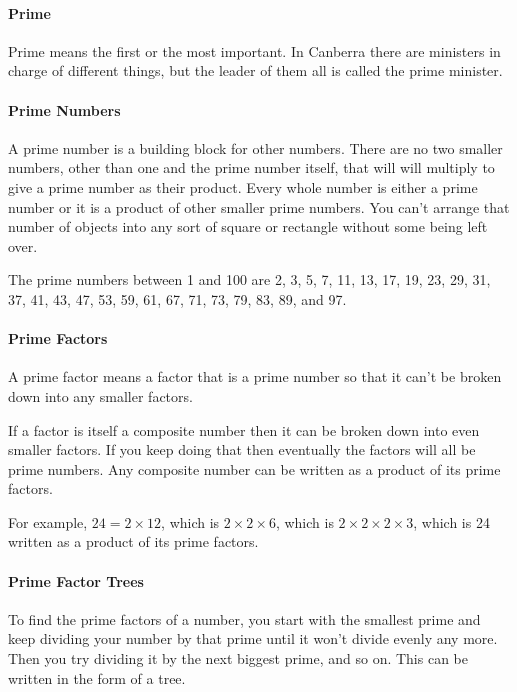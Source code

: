 \documentclass[12pt]{article}
\begin{document}
{\paragraph{Prime}
Prime means the first or the most important. In Canberra there are ministers in charge of different things, but the leader of them all is called the prime minister.

\paragraph{Prime Numbers}
A prime number is a building block for other numbers. There are no two smaller numbers, other than one and the prime number itself, that will will multiply to give a prime number as their product. Every whole number is either a prime number or it is a product of other smaller prime numbers. You can't arrange that number of objects into any sort of square or rectangle without some being left over.

The prime numbers between 1 and 100 are 2, 3, 5, 7, 11, 13, 17, 19, 23, 29, 31, 37, 41, 43, 47, 53, 59, 61, 67, 71, 73, 79, 83, 89, and 97.

\paragraph{Prime Factors}
A prime factor means a factor that is a prime number so that it can’t be broken down into any smaller factors.

If a factor is itself a composite number then it can be broken down into even smaller factors. If you keep doing that then eventually the factors will all be prime numbers. Any composite number can be written as a product of its prime factors.

For example, $24 = 2 \times 12$, which is $2 \times 2 \times 6$, which is $2\times 2 \times 2 \times 3$, which is 24 written as a product of its prime factors.

\paragraph{Prime Factor Trees}

To find the prime factors of a number, you start with the smallest prime and keep dividing your number by that prime until it won’t divide evenly any more. Then you try dividing it by the next biggest prime, and so on. This can be written in the form of a tree.

\begin{center}
\end{center}

}
\end{document}
